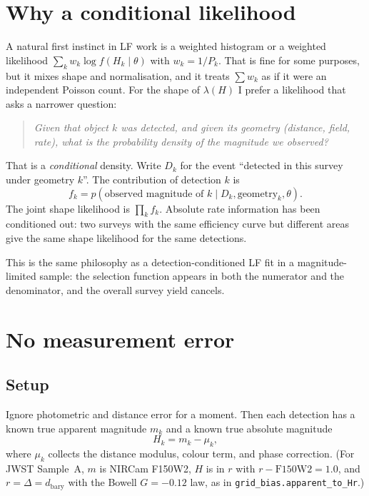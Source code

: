 \documentclass[11pt,a4paper]{article}
\begin{document}
\section{Why a conditional likelihood}
\label{sec:why-conditional}

A natural first instinct in LF work is a weighted histogram or a weighted
likelihood $\sum_k w_k \log f(H_k\mid\theta)$ with $w_k = 1/P_k$.  That is
fine for some purposes, but it mixes shape and normalisation, and it treats
$\sum w_k$ as if it were an independent Poisson count.  For the shape of
$\lambda(H)$ I prefer a likelihood that asks a narrower question:

\begin{quote}
\emph{Given that object $k$ was detected, and given its geometry (distance,
field, rate), what is the probability density of the magnitude we observed?}
\end{quote}

That is a \emph{conditional} density.  Write $D_k$ for the event ``detected in
this survey under geometry $k$''.  The contribution of detection $k$ is
\begin{equation}
  f_k
  = p(\text{observed magnitude of $k$} \mid D_k, \text{geometry}_k, \theta).
  \label{eq:fk-generic}
\end{equation}
The joint shape likelihood is $\prod_k f_k$.  Absolute rate information has
been conditioned out: two surveys with the same efficiency curve but different
areas give the same shape likelihood for the same detections.

This is the same philosophy as a detection-conditioned LF fit in a magnitude-limited
sample: the selection function appears in both the numerator and the
denominator, and the overall survey yield cancels.

\section{No measurement error}
\label{sec:no-error}

\subsection{Setup}

Ignore photometric and distance error for a moment.  Then each detection has a
known true apparent magnitude $m_k$ and a known true absolute magnitude
\begin{equation}
  H_k = m_k - \mu_k,
\end{equation}
where $\mu_k$ collects the distance modulus, colour term, and phase
correction.  (For JWST Sample~A, $m$ is NIRCam F150W2, $H$ is in $r$ with
$r - \mathrm{F150W2} = 1.0$, and $r=\Delta=d_{\mathrm{bary}}$ with the
Bowell $G=-0.12$ law, as in \texttt{grid\_bias.apparent\_to\_Hr}.)
\end{document}
